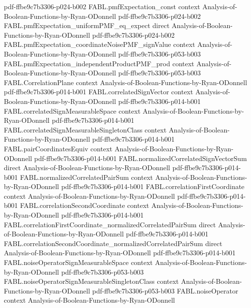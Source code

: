 \begin{theorem}
  {pdf-ffbe9c7b3306-p024-b002}
\proofstep
  {FABL.pmfExpectation_const}
  {context}
  {Analysis-of-Boolean-Functions-by-Ryan-ODonnell}
  {pdf-ffbe9c7b3306-p024-b002}
\proofstep
  {FABL.pmfExpectation_uniformPMF_eq_expect}
  {direct}
  {Analysis-of-Boolean-Functions-by-Ryan-ODonnell}
  {pdf-ffbe9c7b3306-p024-b002}
\proofstep
  {FABL.pmfExpectation_coordinateNoisePMF_signValue}
  {context}
  {Analysis-of-Boolean-Functions-by-Ryan-ODonnell}
  {pdf-ffbe9c7b3306-p053-b003}
\proofstep
  {FABL.pmfExpectation_independentProductPMF_prod}
  {context}
  {Analysis-of-Boolean-Functions-by-Ryan-ODonnell}
  {pdf-ffbe9c7b3306-p053-b003}
\proofstep
  {FABL.CorrelationPlane}
  {context}
  {Analysis-of-Boolean-Functions-by-Ryan-ODonnell}
  {pdf-ffbe9c7b3306-p014-b001}
\proofstep
  {FABL.correlatedSignVector}
  {context}
  {Analysis-of-Boolean-Functions-by-Ryan-ODonnell}
  {pdf-ffbe9c7b3306-p014-b001}
\proofstep
  {FABL.correlatedSignMeasurableSpace}
  {context}
  {Analysis-of-Boolean-Functions-by-Ryan-ODonnell}
  {pdf-ffbe9c7b3306-p014-b001}
\proofstep
  {FABL.correlatedSignMeasurableSingletonClass}
  {context}
  {Analysis-of-Boolean-Functions-by-Ryan-ODonnell}
  {pdf-ffbe9c7b3306-p014-b001}
\proofstep
  {FABL.pairCoordinatesEquiv}
  {context}
  {Analysis-of-Boolean-Functions-by-Ryan-ODonnell}
  {pdf-ffbe9c7b3306-p014-b001}
\proofstep
  {FABL.normalizedCorrelatedSignVectorSum}
  {direct}
  {Analysis-of-Boolean-Functions-by-Ryan-ODonnell}
  {pdf-ffbe9c7b3306-p014-b001}
\proofstep
  {FABL.normalizedCorrelatedPairSum}
  {context}
  {Analysis-of-Boolean-Functions-by-Ryan-ODonnell}
  {pdf-ffbe9c7b3306-p014-b001}
\proofstep
  {FABL.correlationFirstCoordinate}
  {context}
  {Analysis-of-Boolean-Functions-by-Ryan-ODonnell}
  {pdf-ffbe9c7b3306-p014-b001}
\proofstep
  {FABL.correlationSecondCoordinate}
  {context}
  {Analysis-of-Boolean-Functions-by-Ryan-ODonnell}
  {pdf-ffbe9c7b3306-p014-b001}
\proofstep
  {FABL.correlationFirstCoordinate_normalizedCorrelatedPairSum}
  {direct}
  {Analysis-of-Boolean-Functions-by-Ryan-ODonnell}
  {pdf-ffbe9c7b3306-p014-b001}
\proofstep
  {FABL.correlationSecondCoordinate_normalizedCorrelatedPairSum}
  {direct}
  {Analysis-of-Boolean-Functions-by-Ryan-ODonnell}
  {pdf-ffbe9c7b3306-p014-b001}
\proofstep
  {FABL.noiseOperatorSignMeasurableSpace}
  {context}
  {Analysis-of-Boolean-Functions-by-Ryan-ODonnell}
  {pdf-ffbe9c7b3306-p053-b003}
\proofstep
  {FABL.noiseOperatorSignMeasurableSingletonClass}
  {context}
  {Analysis-of-Boolean-Functions-by-Ryan-ODonnell}
  {pdf-ffbe9c7b3306-p053-b003}
\proofstep
  {FABL.noiseOperator}
  {context}
  {Analysis-of-Boolean-Functions-by-Ryan-ODonnell}

\end{theorem}
